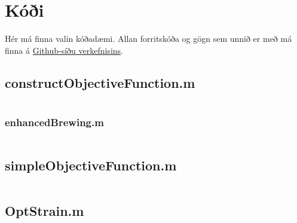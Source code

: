\documentclass[11pt]{article}
\newcommand{\matlab}[1]{\inputminted[linenos, frame=lines, label=#1, fontsize=\small]{matlab}{#1}}
\begin{document}

\clearpage
\appendix
\section{Kóði}
Hér má finna valin kóðadæmi. Allan forritskóða og gögn sem unnið er með má finna á \href{https://github.com/Ernir/optstrain}{Github-síðu verkefnisins}.

\subsection{constructObjectiveFunction.m}
\label{code:constructObjectiveFunction}
\matlab{../constructObjectiveFunction.m}

\subsubsection{enhancedBrewing.m}
\label{code:enhancedBrewing}
\matlab{../enhancedBrewing.m}

\subsection{simpleObjectiveFunction.m}
\label{code:simpleObjectiveFunction}
\matlab{../simpleObjectiveFunction.m}

\subsection{OptStrain.m}
\label{code:OptStrain}
\matlab{../OptStrain.m}
\end{document}

